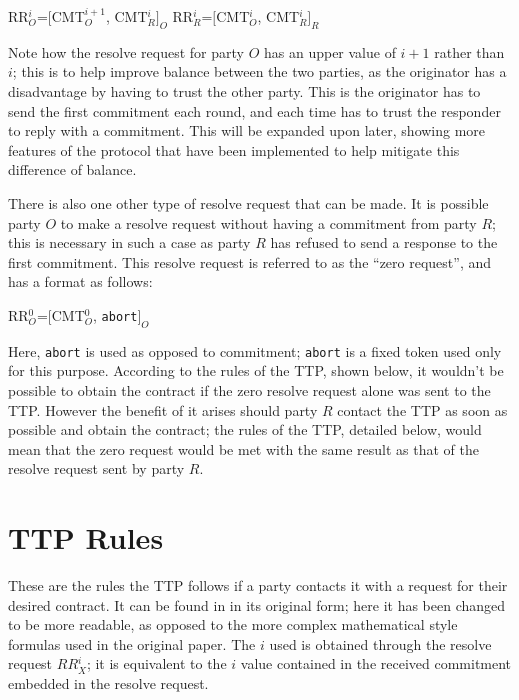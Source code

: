 \documentclass{l4proj}
\begin{document}
\centerline{RR${_{O}^{i}}$=$[$CMT${_{O}^{i+1}}$, CMT${_{R}^{i}}]_O$ \hspace{30mm}  RR${_{R}^{i}}$=$[$CMT${_{O}^{i}}$, CMT${_{R}^{i}}]_R$}

Note how the resolve request for party $O$ has an upper value of $i+1$ rather than $i$; this is to help improve balance between the two parties, as the originator has a disadvantage by having to trust the other party. This is the originator has to send the first commitment each round, and each time has to trust the responder to reply with a commitment. This will be expanded upon later, showing more features of the protocol that have been implemented to help mitigate this difference of balance.

There is also one other type of resolve request that can be made. It is possible party $O$ to make a resolve request without having a commitment from party $R$; this is necessary in such a case as party $R$ has refused to send a response to the first commitment. This resolve request is referred to as the ``zero request'', and has a format as follows:\\

\centerline{RR${_{O}^{0}}$=$[$CMT${_{O}^{0}}$, {\tt abort}$]_O$}

Here, {\tt abort} is used as opposed to commitment; {\tt abort} is a fixed token used only for this purpose. According to the rules of the TTP, shown below, it wouldn't be possible to obtain the contract if the zero resolve request alone was sent to the TTP. However the benefit of it arises should party $R$ contact the TTP as soon as possible and obtain the contract; the rules of the TTP, detailed below, would mean that the zero request would be met with the same result as that of the resolve request sent by party $R$.

\section{TTP Rules}
These are the rules the TTP follows if a party contacts it with a request for their desired contract. It can be found in \cite{ASW09} in its original form; here it has been changed to be more readable, as opposed to the more complex mathematical style formulas used in the original paper. The $i$ used is obtained through the resolve request $RR{_{X}^{i}}$; it is equivalent to the $i$ value contained in the received commitment embedded in the resolve request.
\end{document}
